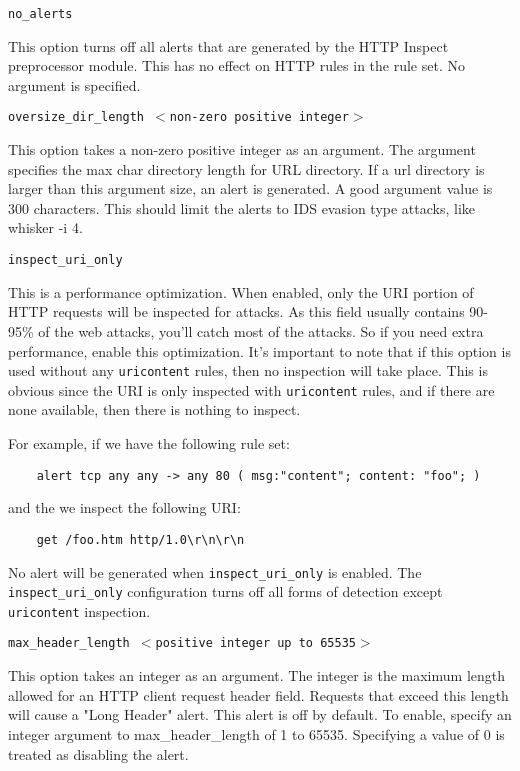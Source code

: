 \documentclass[english]{report}
\newcounter{slistnum}
\newenvironment{slist}
{ \begin{list}{ {\bf \arabic{slistnum}.} }{\usecounter{slistnum} } }
{ \end{list} }
\begin{document}
\begin{slist}
\item \texttt{no\_alerts}

This option turns off all alerts that are generated by the HTTP Inspect
preprocessor module.  This has no effect on HTTP rules in the rule set.  No
argument is specified.

\item \texttt{oversize\_dir\_length $<$non-zero positive integer$>$}

This option takes a non-zero positive integer as an argument.  The argument
specifies the max char directory length for URL directory.  If a url directory
is larger than this argument size, an alert is generated. A good argument value
is 300 characters.  This should limit the alerts to IDS evasion type attacks,
like whisker -i 4.

\item \texttt{inspect\_uri\_only}

This is a performance optimization.  When enabled, only the URI portion of HTTP
requests will be inspected for attacks.  As this field usually contains 90-95\%
of the web attacks, you'll catch most of the attacks.  So if you need extra
performance, enable this optimization.  It's important to note that if this
option is used without any \texttt{uricontent} rules, then no inspection will
take place.  This is obvious since the URI is only inspected with
\texttt{uricontent} rules, and if there are none available, then there is
nothing to inspect.

For example, if we have the following rule set:

\begin{verbatim}
    alert tcp any any -> any 80 ( msg:"content"; content: "foo"; )
\end{verbatim}

and the we inspect the following URI:

\begin{verbatim}
    get /foo.htm http/1.0\r\n\r\n
\end{verbatim}

No alert will be generated when \texttt{inspect\_uri\_only} is enabled.  The
\texttt{inspect\_uri\_only} configuration turns off all forms of detection
except \texttt{uricontent} inspection.

\item \texttt{max\_header\_length $<$positive integer up to 65535$>$}

This option takes an integer as an argument.  The integer is the maximum length
allowed for an HTTP client request header field.  Requests that exceed this
length will cause a "Long Header" alert.  This alert is off by default.  To
enable, specify an integer argument to max\_header\_length of 1 to 65535.
Specifying a value of 0 is treated as disabling the alert.


\end{slist}
\end{document}
